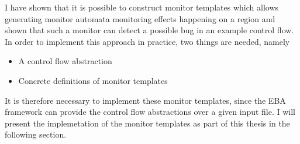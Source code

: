 \newpar I have shown that it is possible to construct monitor templates which allows generating monitor automata monitoring effects happening on a region and shown that such a monitor can detect a possible bug in an example control flow. In order to implement this approach in practice, two things are needed, namely

\begin{itemize}
    \item A control flow abstraction
    \item Concrete definitions of monitor templates
\end{itemize}

\noindent It is therefore necessary to implement these monitor templates, since the EBA framework can provide the control flow abstractions over a given input file. I will present the implemetation of the monitor templates as part of this thesis in the following section. 